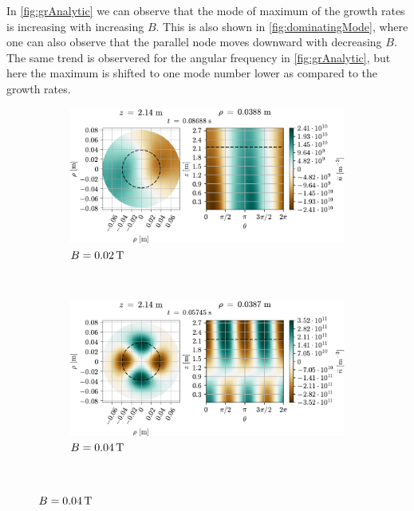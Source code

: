 In \cref{fig:grAnalytic} we can observe that the mode of maximum of the growth rates is increasing with increasing $B$.
This is also shown in \cref{fig:dominatingMode}, where one can also observe that the parallel node moves downward with decreasing $B$.
The same trend is observered for the angular frequency in \cref{fig:grAnalytic}, but here the maximum is shifted to one mode number lower as compared to the growth rates.
%
{
\begin{figure}[htbp]
    \vspace*{-1cm}
    \centering
    \begin{subfigure}[h]{1.00\textwidth}
        \centering
        \includegraphics{fig/results/modesDiffScanVals/B002}
        \caption{$B=0.02 \, \text{T}$}
        \label{fig:B002}
    \end{subfigure}%
    \\
    \begin{subfigure}[h]{1.00\textwidth}
        \centering
        \includegraphics{fig/results/modesDiffScanVals/B004}
        \caption{$B=0.04 \, \text{T}$}
        \label{fig:B004}
    \end{subfigure}
    \\

\end{figure}}

